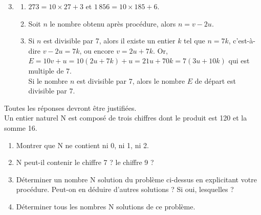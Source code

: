 \begin{corrige}
\begin{enumerate}
      \setcounter{enumi}{2}
      \item       
         \begin{enumerate}
            \item {\blue $273 =10\times27+3$} et {\blue $1\,856 =10\times185+6$.}
            \item Soit $n$ le nombre obtenu après procédure, alors {\blue $n=v-2u$.}
            \item Si $n$ est divisible par 7, alors il existe un entier $k$ tel que $n=7k$, c'est-à-dire $v-2u =7k$, ou encore $v=2u+7k$. Or, $E =10v+u =10(2u+7k)+u =21u+70k =7(3u+10k)$ qui est multiple de 7. \\
               {\blue Si le nombre $n$ est divisible par 7, alors le nombre $E$ de départ est divisible par 7.}
      \end{enumerate}
   \end{enumerate}
\end{corrige}


\bigskip


\begin{exercice}[CRPE 2009 G6] %
   Toutes les réponses devront être justifiées. \\
   Un entier naturel N est composé de trois chiffres dont le produit est 120 et la somme 16.
   \begin{enumerate}
      \item Montrer que N ne contient ni 0, ni 1, ni 2.
      \item N peut-il contenir le chiffre 7 ? le chiffre 9 ?
      \item Déterminer un nombre N solution du problème ci-dessus en explicitant votre procédure. Peut-on en déduire d'autres solutions ? Si oui, lesquelles ?
      \item Déterminer tous les nombres N solutions de ce problème.
   \end{enumerate}
\end{exercice}

